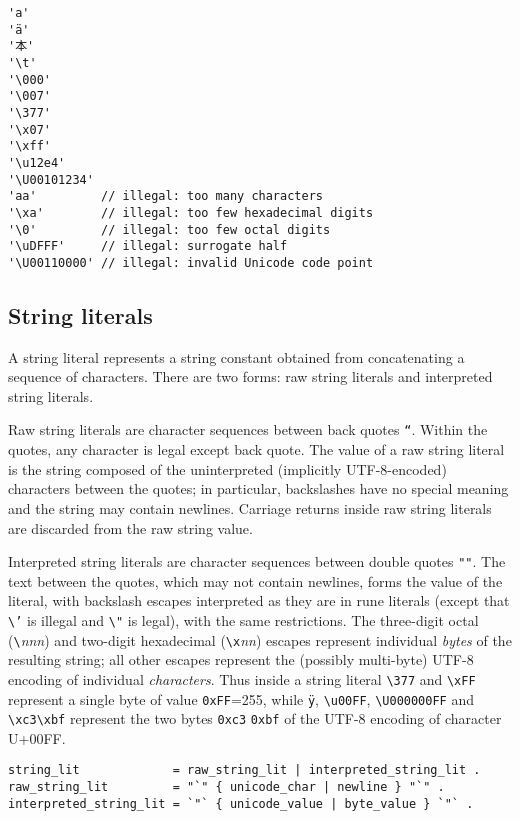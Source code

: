 \begin{Verbatim}[frame=single]
'a'
'ä'
'本'
'\t'
'\000'
'\007'
'\377'
'\x07'
'\xff'
'\u12e4'
'\U00101234'
'aa'         // illegal: too many characters
'\xa'        // illegal: too few hexadecimal digits
'\0'         // illegal: too few octal digits
'\uDFFF'     // illegal: surrogate half
'\U00110000' // illegal: invalid Unicode code point
\end{Verbatim}

\subsection*{String literals}

A string literal represents a string constant
obtained from concatenating a sequence of characters. There are two
forms: raw string literals and interpreted string literals.

Raw string literals are character sequences between back quotes
\texttt{``}. Within the quotes, any character is legal except back
quote. The value of a raw string literal is the string composed of the
uninterpreted (implicitly UTF-8-encoded) characters between the quotes;
in particular, backslashes have no special meaning and the string may
contain newlines. Carriage returns inside raw string literals are
discarded from the raw string value.

Interpreted string literals are character sequences between double
quotes \texttt{""}. The text between the quotes, which may not contain
newlines, forms the value of the literal, with backslash escapes
interpreted as they are in rune literals (except that
\texttt{\textbackslash{}'} is illegal and \texttt{\textbackslash{}"} is
legal), with the same restrictions. The three-digit octal
(\texttt{\textbackslash{}}\emph{nnn}) and two-digit hexadecimal
(\texttt{\textbackslash{}x}\emph{nn}) escapes represent individual
\emph{bytes} of the resulting string; all other escapes represent the
(possibly multi-byte) UTF-8 encoding of individual \emph{characters}.
Thus inside a string literal \texttt{\textbackslash{}377} and
\texttt{\textbackslash{}xFF} represent a single byte of value
\texttt{0xFF}=255, while \texttt{ÿ}, \texttt{\textbackslash{}u00FF},
\texttt{\textbackslash{}U000000FF} and
\texttt{\textbackslash{}xc3\textbackslash{}xbf} represent the two bytes
\texttt{0xc3} \texttt{0xbf} of the UTF-8 encoding of character U+00FF.

\begin{Verbatim}[frame=single]
string_lit             = raw_string_lit | interpreted_string_lit .
raw_string_lit         = "`" { unicode_char | newline } "`" .
interpreted_string_lit = `"` { unicode_value | byte_value } `"` .
\end{Verbatim}

